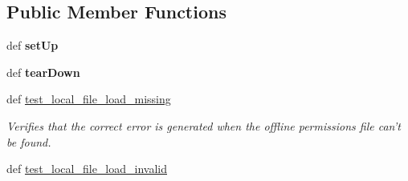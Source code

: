 \subsection*{Public Member Functions}
\begin{DoxyCompactItemize}
\item 
\hypertarget{classhwm_1_1network_1_1security_1_1tests_1_1test__permission__manager_1_1_test_permission_manager_a61a58a4a9bcd519e596ac948f9e0a300}{def {\bfseries set\-Up}}\label{classhwm_1_1network_1_1security_1_1tests_1_1test__permission__manager_1_1_test_permission_manager_a61a58a4a9bcd519e596ac948f9e0a300}

\item 
\hypertarget{classhwm_1_1network_1_1security_1_1tests_1_1test__permission__manager_1_1_test_permission_manager_aa7e122dfe0bcd7e71ab96c86fb861ee9}{def {\bfseries tear\-Down}}\label{classhwm_1_1network_1_1security_1_1tests_1_1test__permission__manager_1_1_test_permission_manager_aa7e122dfe0bcd7e71ab96c86fb861ee9}

\item 
\hypertarget{classhwm_1_1network_1_1security_1_1tests_1_1test__permission__manager_1_1_test_permission_manager_abcc7964d11265a0872f92bca987c3d64}{def \hyperlink{classhwm_1_1network_1_1security_1_1tests_1_1test__permission__manager_1_1_test_permission_manager_abcc7964d11265a0872f92bca987c3d64}{test\-\_\-local\-\_\-file\-\_\-load\-\_\-missing}}\label{classhwm_1_1network_1_1security_1_1tests_1_1test__permission__manager_1_1_test_permission_manager_abcc7964d11265a0872f92bca987c3d64}

\begin{DoxyCompactList}\small\item\em Verifies that the correct error is generated when the offline permissions file can't be found. \end{DoxyCompactList}\item 
\hypertarget{classhwm_1_1network_1_1security_1_1tests_1_1test__permission__manager_1_1_test_permission_manager_a9bdeb7e26ec75254ecd4618aa1acaf41}{def \hyperlink{classhwm_1_1network_1_1security_1_1tests_1_1test__permission__manager_1_1_test_permission_manager_a9bdeb7e26ec75254ecd4618aa1acaf41}{test\-\_\-local\-\_\-file\-\_\-load\-\_\-invalid}}\label{classhwm_1_1network_1_1security_1_1tests_1_1test__permission__manager_1_1_test_permission_manager_a9bdeb7e26ec75254ecd4618aa1acaf41}


\end{DoxyCompactItemize}
